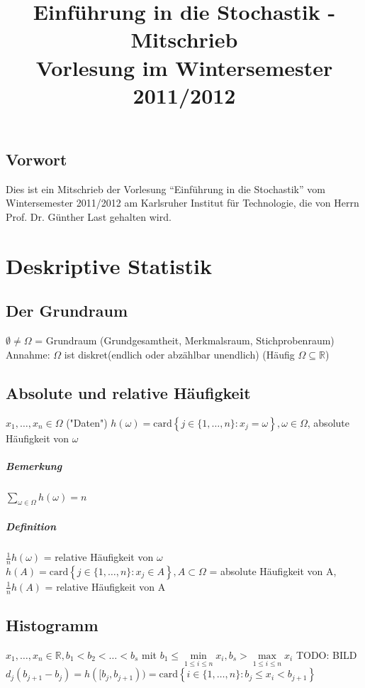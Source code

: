 \documentclass[a4paper,11pt,notitlepage]{report}
\title{\textbf{{Einführung in die Stochastik - Mitschrieb} \\[5ex] 
    {\Large Vorlesung im Wintersemester 2011/2012\\[5ex]}}}
\author{\myname{Sarah Lutteropp}}
\newcommand{\R}{{\ensuremath{\mathbb{R}}}}
\begin{document}
\maketitle
\setcounter{tocdepth}{1}
\tableofcontents

\section*{Vorwort}
Dies ist ein Mitschrieb der Vorlesung “Einführung in die Stochastik” vom Wintersemester 2011/2012 am Karlsruher Institut für Technologie, die von Herrn Prof. Dr. Günther Last gehalten wird.

\chapter{Deskriptive Statistik}
\section{Der Grundraum}
$\emptyset \neq \Omega$ = Grundraum (Grundgesamtheit, Merkmalsraum, Stichprobenraum)
Annahme: $\Omega$ ist diskret(endlich oder abzählbar unendlich) (Häufig $\Omega \subseteq \R$)

\section{Absolute und relative Häufigkeit}
$x_1, \ldots, x_n \in \Omega$ ("Daten") \newline
$h(\omega) = \text{card}\left\{j\in\{1, \ldots, n\} \colon x_j = \omega\right\}, \omega \in \Omega$, absolute Häufigkeit von $\omega$

\paragraph{Bemerkung}
$\sum\limits_{\omega \in \Omega}{h(\omega)} = n$

\paragraph{Definition}
$\frac{1}{n} h(\omega)$ = relative Häufigkeit von $\omega$ \newline
$h(A)=\text{card}\left\{j\in\{1,\ldots,n\}\colon x_j \in A\right\}, A \subset \Omega$ = absolute Häufigkeit von A, $\frac{1}{n} h(A)$ = relative Häufigkeit von A

\section{Histogramm}
$x_1, \ldots, x_n \in \R, b_1 < b_2 < \ldots < b_s$ mit $b_1 \leq \min\limits_{1 \leq i \leq n}{x_i}, b_s > \max\limits_{1 \leq i \leq n}{x_i}$
\newline
TODO: BILD
\newline
$d_j(b_{j+1}-b_j)=h([b_j,b_{j+1})) = \text{card} \left\{i\in\{1,\ldots,n\}\colon b_j \leq x_i < b_{j+1}\right\}$
\end{document}
